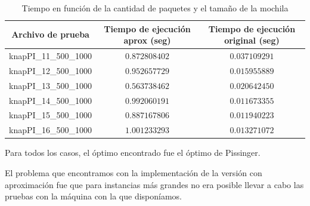 \documentclass[a4paper,10pt]{article}
\begin{document}
\begin{table}[H]
\centering
\begin{tabular}{|c|c|c|}
\hline
Archivo de prueba	& Tiempo de ejecución aprox (seg) & Tiempo de ejecución original (seg)\\\hline
knapPI\_11\_500\_1000	& $0.872808402$ & $0.037109291$ \\\hline 
knapPI\_12\_500\_1000	& $0.952657729$ & $0.015955889$ \\\hline 
knapPI\_13\_500\_1000	& $0.563738462$ & $0.020642450$ \\\hline 
knapPI\_14\_500\_1000	& $0.992060191$ & $0.011673355$ \\\hline 
knapPI\_15\_500\_1000	& $0.887167806$ & $0.011940223$ \\\hline 
knapPI\_16\_500\_1000	& $1.001233293$ & $0.013271072$ \\\hline 
\end{tabular}
\caption{Tiempo en función de la cantidad de paquetes y el tamaño de la mochila}
\label{tab:held}
\end{table}

Para todos los casos, el óptimo encontrado fue el óptimo de Pissinger.

El problema que encontramos con la implementación de la versión con aproximación fue que para instancias más grandes no era posible llevar a cabo las pruebas con la máquina con la que disponíamos.
\end{document}
